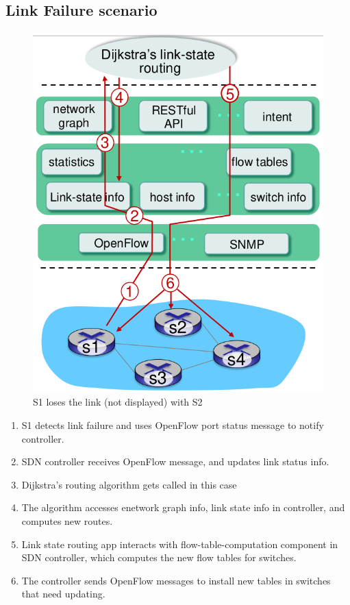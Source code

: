 \subsection{Link Failure scenario}
\begin{paracol}{2}
   
   \begin{figure}[htbp]
      \centering
      \includegraphics{images/sdn_linkdown.png}
      \caption{S1 loses the link (not displayed) with S2}
      \label{fig:sdn_linkdown}
      \end{figure}
   \switchcolumn
   \begin{enumerate}
      \item S1 detects link failure and uses OpenFlow port status message to notify controller.
      \item SDN controller receives OpenFlow message, and updates link status info.
      \item Dijkstra's routing algorithm gets called in this case
      \item The algorithm accesses enetwork graph info, link state info in controller, and computes new routes.
      \item Link state routing app interacts with flow-table-computation component in SDN controller, which computes the new flow tables for switches.
      \item The controller sends OpenFlow messages to install new tables in switches that need updating.
   \end{enumerate}   
   \end{paracol}


